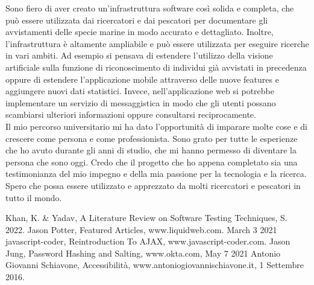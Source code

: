 \documentclass[a4paper,final,12pt]{report}
\begin{document}
Sono fiero di aver creato un'infrastruttura software così solida e completa, che può essere utilizzata dai ricercatori e dai pescatori per documentare gli avvistamenti delle specie marine in modo accurato e dettagliato. Inoltre, l'infrastruttura è altamente ampliabile e può essere utilizzata per eseguire ricerche in vari ambiti. Ad esempio si pensava di estendere l'utilizzo della visione artificiale sulla funzione di riconoscimento di individui già avvistati in precedenza oppure di estendere l'applicazione mobile attraverso delle nuove features e aggiungere nuovi dati statistici. Invece, nell'applicazione web si potrebbe implementare un servizio di messaggistica in modo che gli utenti possano scambiarsi ulteriori informazioni oppure consultarsi reciprocamente.\\

Il mio percorso universitario mi ha dato l'opportunità di imparare molte cose e di crescere come persona e come professionista. Sono grato per tutte le esperienze che ho avuto durante gli anni di studio, che mi hanno permesso di diventare la persona che sono oggi. Credo che il progetto che ho appena completato sia una testimonianza del mio impegno e della mia passione per la tecnologia e la ricerca. Spero che possa essere utilizzato e apprezzato da molti ricercatori e pescatori in tutto il mondo.



\begin{thebibliography}{100}
 Khan, K. \& Yadav, A Literature Review on Software Testing Techniques, S. 2022.
 Jason Potter, Featured Articles, www.liquidweb.com. March 3 2021
 javascript-coder, Reintroduction To AJAX, www.javascript-coder.com.
 Jason Jung, Password Hashing and Salting, www.okta.com, May 7 2021
 Antonio Giovanni Schiavone, Accessibilità, www.antoniogiovannischiavone.it, 1 Settembre 2016.
\end{thebibliography}
\end{document}
